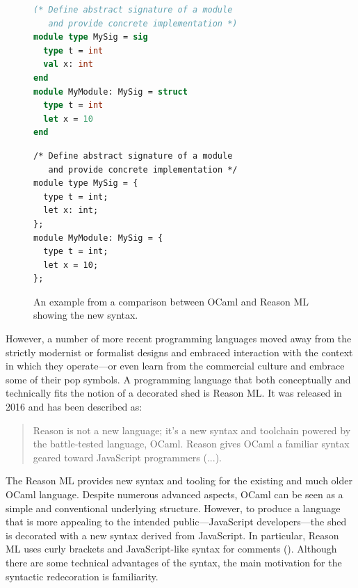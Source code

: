 \begin{figure}[t]
\begin{minipage}[t]{.5\textwidth}%
\begin{lstlisting}[language=ocaml]
(* Define abstract signature of a module
   and provide concrete implementation *)
module type MySig = sig
  type t = int
  val x: int
end
module MyModule: MySig = struct
  type t = int
  let x = 10
end
\end{lstlisting}
\end{minipage}
\begin{minipage}[t]{.5\textwidth}%
\begin{lstlisting}[language=reasonml]
/* Define abstract signature of a module
   and provide concrete implementation */
module type MySig = {
  type t = int;
  let x: int;
};
module MyModule: MySig = {
  type t = int;
  let x = 10;
};
\end{lstlisting}
\end{minipage}
\caption{An example from a comparison between OCaml and Reason ML showing the new syntax.}
\label{fig:reason}
\end{figure}

However, a number of more recent programming languages moved away from the strictly modernist or
formalist designs and embraced interaction with the context in which they operate---or even learn
from the commercial culture and embrace some of their pop symbols. A programming language that
both conceptually and technically fits the notion of a decorated shed is Reason ML.
It was released in 2016 and has been described as:

\begin{quote}
Reason is not a new language; it's a new syntax and toolchain powered by the battle-tested
language, OCaml. Reason gives OCaml a familiar syntax geared toward JavaScript programmers
(...).
\end{quote}

The Reason ML provides new syntax and tooling for the existing and much older OCaml language.
Despite numerous advanced aspects, OCaml can be seen as a simple and conventional underlying
structure. However, to produce a language that is more appealing to the intended public---JavaScript
developers---the shed is decorated with a new syntax derived from JavaScript. In particular,
Reason ML uses curly brackets and JavaScript-like syntax for comments ().
Although there are some technical advantages of the syntax, the main motivation for the
syntactic redecoration is familiarity.


